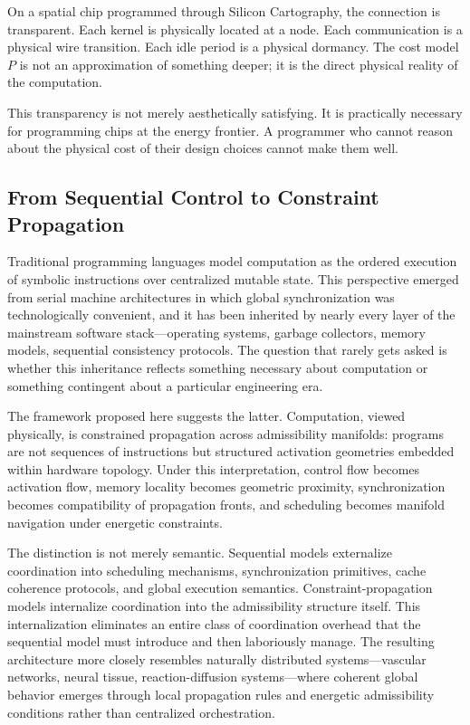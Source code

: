 \documentclass[11pt, a4paper]{article}
\begin{document}
On a spatial chip programmed through Silicon Cartography, the connection is transparent.
Each kernel is physically located at a node. Each communication is a physical wire
transition. Each idle period is a physical dormancy. The cost model $P$ is not
an approximation of something deeper; it is the direct physical reality of the computation.

This transparency is not merely aesthetically satisfying. It is practically necessary
for programming chips at the energy frontier. A programmer who cannot reason about
the physical cost of their design choices cannot make them well.

\subsection{From Sequential Control to Constraint Propagation}

Traditional programming languages model computation as the ordered execution of
symbolic instructions over centralized mutable state. This perspective emerged from
serial machine architectures in which global synchronization was technologically
convenient, and it has been inherited by nearly every layer of the mainstream software
stack---operating systems, garbage collectors, memory models, sequential consistency
protocols. The question that rarely gets asked is whether this inheritance reflects
something necessary about computation or something contingent about a particular
engineering era.

The framework proposed here suggests the latter. Computation, viewed physically,
is constrained propagation across admissibility manifolds: programs are not sequences
of instructions but structured activation geometries embedded within hardware topology.
Under this interpretation, control flow becomes activation flow, memory locality
becomes geometric proximity, synchronization becomes compatibility of propagation
fronts, and scheduling becomes manifold navigation under energetic constraints.

The distinction is not merely semantic. Sequential models externalize coordination
into scheduling mechanisms, synchronization primitives, cache coherence protocols,
and global execution semantics. Constraint-propagation models internalize coordination
into the admissibility structure itself. This internalization eliminates an entire
class of coordination overhead that the sequential model must introduce and then
laboriously manage. The resulting architecture more closely resembles naturally
distributed systems---vascular networks, neural tissue, reaction-diffusion
systems---where coherent global behavior emerges through local propagation rules
and energetic admissibility conditions rather than centralized orchestration.
\end{document}
